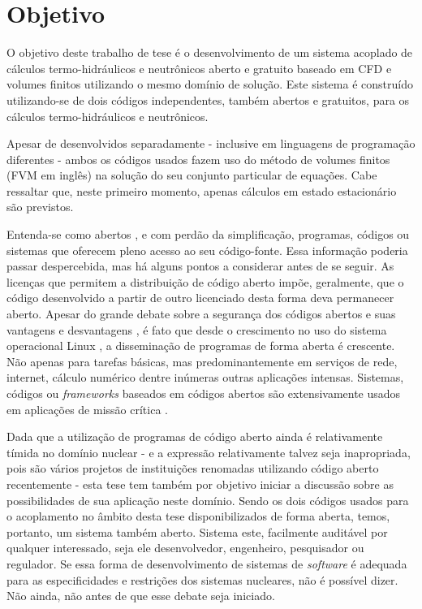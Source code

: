 \section{Objetivo}

O objetivo deste trabalho de tese é o desenvolvimento de um sistema acoplado de cálculos
termo-hidráulicos e neutrônicos aberto e gratuito baseado em CFD e volumes finitos utilizando
o mesmo domínio de solução. Este sistema é construído utilizando-se de dois códigos independentes, também
abertos e gratuitos, para os cálculos termo-hidráulicos e neutrônicos. 

Apesar de desenvolvidos separadamente - inclusive
em linguagens de programação diferentes - ambos os códigos usados fazem uso do método de volumes
finitos \cite{Eymard2003} (FVM em inglês) na solução do seu conjunto particular de equações.
Cabe ressaltar que, neste primeiro momento, apenas cálculos em estado estacionário
são previstos.

Entenda-se como abertos \cite[Capítulo~3]{Stallman2002}, e com perdão da simplificação, programas, códigos ou sistemas
que oferecem pleno acesso ao seu código-fonte. Essa informação poderia passar despercebida,
mas há alguns pontos a considerar antes de se
seguir. As licenças que permitem a distribuição de código aberto impõe, geralmente, que
o código desenvolvido a partir de outro licenciado desta forma deva permanecer aberto.
Apesar do grande debate sobre a segurança dos códigos abertos e suas vantagens e desvantagens \cite[Seção~2.6]{Androutsellis2010},
é fato que desde o crescimento no uso do sistema operacional Linux \cite{LinuxBritannica}, a disseminação de programas de forma aberta é crescente.
Não apenas para tarefas básicas, mas predominantemente em serviços de rede, internet, cálculo numérico dentre
inúmeras outras aplicações intensas. Sistemas, códigos ou \textit{frameworks} baseados em códigos abertos são
extensivamente usados em aplicações de missão crítica \cite{Norris2004}.

Dada que a utilização de programas de código aberto ainda é relativamente tímida no domínio nuclear
- e a expressão relativamente talvez seja inapropriada, pois são vários projetos de instituições
renomadas utilizando código aberto recentemente \cite{Romano2013, Boyd2014, Huff2016} -
esta tese tem também por objetivo iniciar a discussão sobre as possibilidades de sua
aplicação neste domínio. Sendo os dois códigos usados para o acoplamento no âmbito desta tese disponibilizados
de forma aberta, temos, portanto, um sistema também aberto. Sistema este, facilmente auditável
por qualquer interessado, seja ele desenvolvedor, engenheiro, pesquisador ou regulador.
Se essa forma de desenvolvimento de sistemas de \textit{software} é adequada para as especificidades
e restrições dos sistemas nucleares, não é possível dizer. Não ainda, não antes de que esse debate
seja iniciado.


